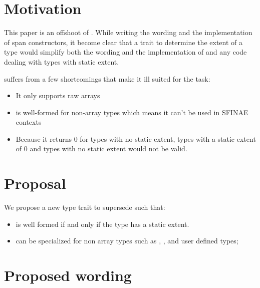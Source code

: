 \documentclass{wg21}
\begin{document}
\section{Motivation}

This paper is an offshoot of \cite{P1394}. While writing the wording and the implementation of span constructors, it become clear that
a trait to determine the extent of a type would simplify both the wording and the implementation of  and any code 
dealing with types with static extent.

 suffers from a few shortcomings that make it ill suited for the task:

\begin{itemize}
	\item It only supports raw arrays
	\item {} is well-formed for non-array types which means it can't be used in SFINAE contexts
	\item Because it returns 0 for types with no static extent, types with a static extent of 0 and types with no static extent would not be valid.
\end{itemize}

\section{Proposal}

We propose a new type trait  to supersede  such that:

\begin{itemize}
	\item {} is well formed if and only if the type has a static extent.
	\item {} can be specialized for non array types such as  , , 
	and user defined types;
\end{itemize}


\section{Proposed wording}
\end{document}
